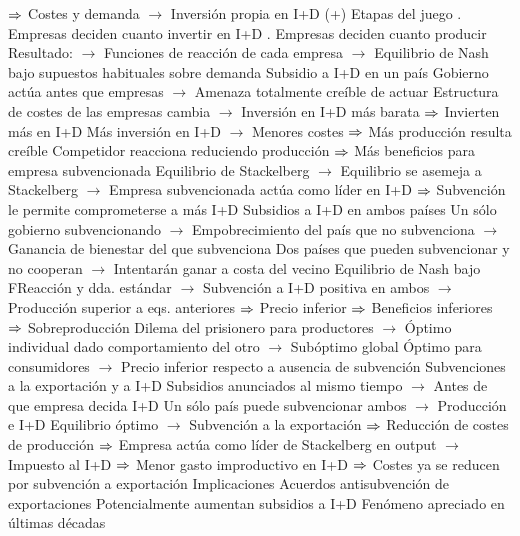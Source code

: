 \documentclass{nuevotema}
\begin{document}
\begin{esquemal}
				\4[] $\Rightarrow$ Costes y demanda
				\4[] $\to$ Inversión propia en I+D (+)
				\4 Etapas del juego
				. Empresas deciden cuanto invertir en I+D
				. Empresas deciden cuanto producir
				\4[] Resultado:
				\4[] $\to$ Funciones de reacción de cada empresa
				\4[] $\to$ Equilibrio de Nash bajo supuestos habituales sobre demanda
				\4 Subsidio a I+D en un país
				\4[] Gobierno actúa antes que empresas
				\4[] $\to$ Amenaza totalmente creíble de actuar
				\4[] Estructura de costes de las empresas cambia
				\4[] $\to$ Inversión en I+D más barata
				\4[] $\Rightarrow$ Invierten más en I+D
				\4[] Más inversión en I+D
				\4[] $\to$ Menores costes
				\4[] $\Rightarrow$ Más producción resulta creíble
				\4[] Competidor reacciona reduciendo producción
				\4[] $\Rightarrow$ Más beneficios para empresa subvencionada
				\4[] Equilibrio de Stackelberg
				\4[] $\to$ Equilibrio se asemeja a Stackelberg
				\4[] $\to$ Empresa subvencionada actúa como líder en I+D
				\4[] $\Rightarrow$ Subvención le permite comprometerse a más I+D
				\4[] 
				\4 Subsidios a I+D en ambos países
				\4[] Un sólo gobierno subvencionando
				\4[] $\to$ Empobrecimiento del país que no subvenciona
				\4[] $\to$ Ganancia de bienestar del que subvenciona
				\4[] Dos países que pueden subvencionar y no cooperan
				\4[] $\to$ Intentarán ganar a costa del vecino
				\4[] Equilibrio de Nash bajo FReacción y dda. estándar
				\4[] $\to$ Subvención a I+D positiva en ambos
				\4[] $\to$ Producción superior a eqs. anteriores
				\4[] $\Rightarrow$ Precio inferior
				\4[] $\Rightarrow$ Beneficios inferiores
				\4[] $\Rightarrow$ Sobreproducción
				\4[] Dilema del prisionero para productores
				\4[] $\to$ Óptimo individual dado comportamiento del otro
				\4[] $\to$ Subóptimo global
				\4[] Óptimo para consumidores
				\4[] $\to$ Precio inferior respecto a ausencia de subvención
				\4 Subvenciones a la exportación y a I+D
				\4[] Subsidios anunciados al mismo tiempo
				\4[] $\to$ Antes de que empresa decida I+D
				\4[] Un sólo país puede subvencionar ambos
				\4[] $\to$ Producción e I+D
				\4[] Equilibrio óptimo
				\4[] $\to$ Subvención a la exportación
				\4[] $\Rightarrow$ Reducción de costes de producción
				\4[] $\Rightarrow$ Empresa actúa como líder de Stackelberg en output
				\4[] $\to$ Impuesto al I+D
				\4[] $\Rightarrow$ Menor gasto improductivo en I+D
				\4[] $\Rightarrow$ Costes ya se reducen por subvención a exportación
			\3 Implicaciones
				\4 Acuerdos antisubvención de exportaciones
				\4[] Potencialmente aumentan subsidios a I+D
				\4[] Fenómeno apreciado en últimas décadas

\end{esquemal}
\end{document}
